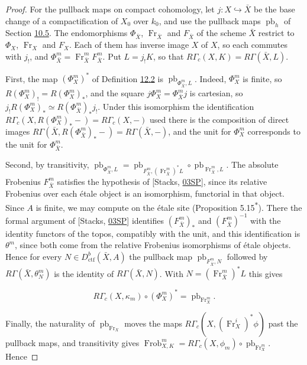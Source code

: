 \documentclass[11pt]{article}
\newcommand{\bpout}[1]{#1\textsuperscript{\hyperlink{bp-outside}{\ensuremath{\ast}}}}
\begin{document}
\begin{proof}[{Proof}]
For the pullback maps on compact cohomology, let \(j:X\hookrightarrow\bar X\) be the base change of a compactification of \(X_0\) over \(k_0\), and use the pullback maps \(\operatorname{pb}_h\) of Section \hyperref[bp154]{10.5}. The endomorphisms \(\Phi_{\bar X}\), \(\operatorname{Fr}_{\bar X}\) and \(F_{\bar X}\) of the scheme \(\bar X\) restrict to \(\Phi_X\), \(\operatorname{Fr}_X\) and \(F_X\). Each of them has inverse image \(X\) of \(X\), so each commutes with \(j_!\), and \(\Phi_{\bar X}^m=\operatorname{Fr}_{\bar X}^mF_{\bar X}^m\). Put \(L=j_!K\), so that \(R\Gamma_c(X,K)=R\Gamma(\bar X,L)\).

First, the map \((\Phi_X^m)^*\) of Definition \hyperref[bp232]{12.2} is \(\operatorname{pb}_{\Phi_{\bar X}^m,L}\). Indeed, \(\Phi_X^m\) is finite, so \(R(\Phi_X^m)_!=R(\Phi_X^m)_*\), and the square \(j\Phi_X^m=\Phi_{\bar X}^mj\) is cartesian, so \(j_!R(\Phi_X^m)_*\simeq R(\Phi_{\bar X}^m)_*j_!\). Under this isomorphism the identification \(R\Gamma_c(X,R(\Phi_X^m)_*-)=R\Gamma_c(X,-)\) used there is the composition of direct images \(R\Gamma(\bar X,R(\Phi_{\bar X}^m)_*-)=R\Gamma(\bar X,-)\), and the unit for \(\Phi_X^m\) corresponds to the unit for \(\Phi_{\bar X}^m\).

Second, by transitivity, \(\operatorname{pb}_{\Phi_{\bar X}^m,L}
 =\operatorname{pb}_{F_{\bar X}^m,(\operatorname{Fr}_{\bar X}^m)^*L}\circ
 \operatorname{pb}_{\operatorname{Fr}_{\bar X}^m,L}\). The absolute Frobenius \(F_{\bar X}^m\) satisfies the hypothesis of [Stacks, \href{https://stacks.math.columbia.edu/tag/03SP}{03SP}], since its relative Frobenius over each étale object is an isomorphism, functorial in that object. Since \(A\) is finite, we may compute on the étale site (Proposition \bpout{5.15}). There the formal argument of [Stacks, \href{https://stacks.math.columbia.edu/tag/03SP}{03SP}] identifies \((F_{\bar X}^m)_*\) and \((F_{\bar X}^m)^{-1}\) with the identity functors of the topos, compatibly with the unit, and this identification is \(\theta^m\), since both come from the relative Frobenius isomorphisms of étale objects. Hence for every \(N\in D^b_{\mathrm{ctf}}(\bar X,A)\) the pullback map \(\operatorname{pb}_{F_{\bar X}^m,N}\) followed by \(R\Gamma(\bar X,\theta^m_N)\) is the identity of \(R\Gamma(\bar X,N)\). With \(N=(\operatorname{Fr}_{\bar X}^m)^*L\) this gives

\[
R\Gamma_c(X,\kappa_m)\circ(\Phi_X^m)^*=\operatorname{pb}_{\operatorname{Fr}_X^m} .
\]

Finally, the naturality of \(\operatorname{pb}_{\operatorname{Fr}_X}\) moves the maps \(R\Gamma_c(X,(\operatorname{Fr}_X^i)^*\phi)\) past the pullback maps, and transitivity gives \(\operatorname{Frob}_{X,K}^m=R\Gamma_c(X,\phi_m)\circ\operatorname{pb}_{\operatorname{Fr}_X^m}\). Hence


\end{proof}
\end{document}
